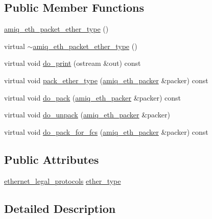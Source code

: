 \subsection*{Public Member Functions}
\begin{DoxyCompactItemize}
\item 
\hyperlink{classamiq__eth__packet__ether__type_a1564c7b9fd6f3ecde8d224c2bb3f4294}{amiq\_\-eth\_\-packet\_\-ether\_\-type} ()
\item 
virtual \hyperlink{classamiq__eth__packet__ether__type_a7e5ab86fde67a32a33aa71871be5023b}{$\sim$amiq\_\-eth\_\-packet\_\-ether\_\-type} ()
\item 
virtual void \hyperlink{classamiq__eth__packet__ether__type_a9b2852fa1aaf278138fde2232e446f63}{do\_\-print} (ostream \&out) const 
\item 
virtual void \hyperlink{classamiq__eth__packet__ether__type_ac7056e1a4bc251384bcea25055ee62da}{pack\_\-ether\_\-type} (\hyperlink{classamiq__eth__packer}{amiq\_\-eth\_\-packer} \&packer) const 
\item 
virtual void \hyperlink{classamiq__eth__packet__ether__type_a62fe5f26a466f0bd0045599b89aa6926}{do\_\-pack} (\hyperlink{classamiq__eth__packer}{amiq\_\-eth\_\-packer} \&packer) const 
\item 
virtual void \hyperlink{classamiq__eth__packet__ether__type_a0c86ef80c46bbed384739b23e5efb0ef}{do\_\-unpack} (\hyperlink{classamiq__eth__packer}{amiq\_\-eth\_\-packer} \&packer)
\item 
virtual void \hyperlink{classamiq__eth__packet__ether__type_aaa85cf778650e1c1b377392a975cb7bc}{do\_\-pack\_\-for\_\-fcs} (\hyperlink{classamiq__eth__packer}{amiq\_\-eth\_\-packer} \&packer) const 
\end{DoxyCompactItemize}
\subsection*{Public Attributes}
\begin{DoxyCompactItemize}
\item 
\hyperlink{amiq__eth__types_8cpp_a37b16207afec6c164b234103e61309c4}{ethernet\_\-legal\_\-protocols} \hyperlink{classamiq__eth__packet__ether__type_a6d7d60a348004a078df2635936c8483a}{ether\_\-type}
\end{DoxyCompactItemize}


\subsection{Detailed Description}


